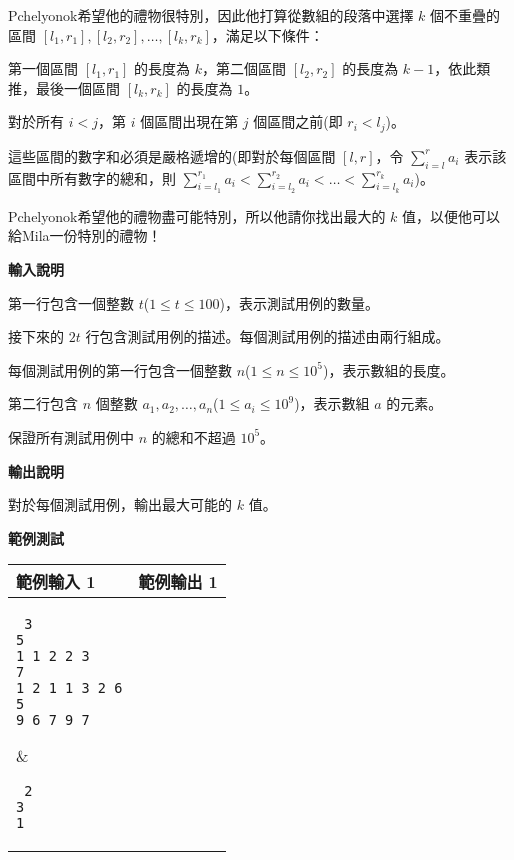     Pchelyonok希望他的禮物很特別，因此他打算從數組的段落中選擇 $k$ 個不重疊的區間 $[l_1,r_1], [l_2,r_2], \ldots, [l_k,r_k]$，滿足以下條件：
    
    第一個區間 $[l_1,r_1]$ 的長度為 $k$，第二個區間 $[l_2,r_2]$ 的長度為 $k-1$，依此類推，最後一個區間 $[l_k,r_k]$ 的長度為 $1$。
    
    對於所有 $i<j$，第 $i$ 個區間出現在第 $j$ 個區間之前(即 $r_i < l_j$)。
    
    這些區間的數字和必須是嚴格遞增的(即對於每個區間 $[l,r]$，令 $\sum_{i=l}^{r} a_i$ 表示該區間中所有數字的總和，則 $\sum_{i=l_1}^{r_1} a_i < \sum_{i=l_2}^{r_2} a_i < \ldots < \sum_{i=l_k}^{r_k} a_i$)。
    
    Pchelyonok希望他的禮物盡可能特別，所以他請你找出最大的 $k$ 值，以便他可以給Mila一份特別的禮物！

    \textbf{輸入說明}

    第一行包含一個整數 $t$($1 \le t \le 100$)，表示測試用例的數量。
    
    接下來的 $2t$ 行包含測試用例的描述。每個測試用例的描述由兩行組成。
    
    每個測試用例的第一行包含一個整數 $n$($1 \le n \le 10^5$)，表示數組的長度。
    
    第二行包含 $n$ 個整數 $a_1, a_2, \ldots, a_n$($1 \le a_i \le 10^9$)，表示數組 $a$ 的元素。
    
    保證所有測試用例中 $n$ 的總和不超過 $10^5$。

    \textbf{輸出說明}

    對於每個測試用例，輸出最大可能的 $k$ 值。
    
    \textbf{範例測試}

    \begin{tabular}{|m{7cm}|m{7cm}|}
        \hline
        範例輸入 1 & 範例輸出 1 \\
        \hline
        \parbox[t]{7cm} %
        { \tt
        3 \\
        5 \\
        1 1 2 2 3 \\
        7 \\
        1 2 1 1 3 2 6 \\
        5 \\
        9 6 7 9 7 \\        
        } &
        \parbox[t]{7cm}
        { \tt
        2 \\
        3 \\
        1 \\
        } \\
        \hline
    \end{tabular}

